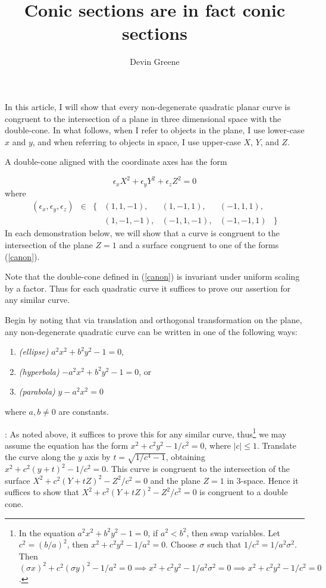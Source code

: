 \documentclass[12pt]{article}
\title{Conic sections are in fact conic sections}
\author{Devin Greene}
\date{}
\newcommand{\eps}{\epsilon}
\begin{document}
\maketitle

In this article, I will show that every non-degenerate quadratic
planar curve is congruent to the intersection of a plane in three
dimensional space with the double-cone.  In what follows, when I 
refer to objects in the plane, I use lower-case $x$ and $y$, and
when referring to objects in space, I use upper-case $X$, $Y$, and
$Z$.

A double-cone aligned with the coordinate axes has the form 

\begin{equation} \label{canon} \eps_x X^2 + \eps_y Y^2 + \eps_z
Z^2 = 0\end{equation}
where
$$\begin{matrix}(\eps_x,\eps_y,\eps_z) & \in  &
\{ &(1,1,-1),&(1,-1,1),&(-1,1,1), &\\
&&&(1,-1,-1),&(-1,1,-1),&(-1,-1,1) &\}\end{matrix}$$
In each demonstration below, we will show that a curve is congruent to
the intersection of the plane $Z = 1$ and a surface congruent to one
of the forms (\ref{canon}).

Note that the double-cone defined in (\ref{canon}) is invariant under
uniform scaling by a factor.  Thus for each quadratic curve it
suffices to prove our assertion for any similar curve.

Begin by noting that via translation and orthogonal transformation on
the plane, any non-degenerate quadratic curve can be written in one of
the following ways:

\begin{enumerate}
\item {\it (ellipse)} $a^2x^2 + b^2y^2 - 1 = 0$,
\item {\it (hyperbola)} $-a^2x^2 + b^2y^2 - 1 = 0$, or
\item {\it (parabola)} $y - a^2x^2 = 0$
\end{enumerate}
where $a,b \neq 0$ are constants.

\medskip

: As noted above, it suffices to prove this for
any similar curve, thus\footnote{
In the equation $a^2x^2 + b^2y^2 - 1 = 0$, if $a^2 < b^2$, then swap
variables.  Let $c^2 = (b/a)^2$, then $x^2 + c^2 y^2 - 1/a^2 = 0$.
Choose $\sigma$ such that $1/c^2 = 1/a^2\sigma^2$.  Then
$(\sigma x)^2
+ c^2 (\sigma y)^2 - 1/a^2 = 0 \implies x^2  + c^2 y^2 - 1/a^2\sigma^2
= 0 \implies x^2 + c^2 y^2 - 1/c^2 = 0$.
}
we may assume the equation has the form $x^2 + c^2 y^2 - 1/c^2 = 0$,
where $|c| \leq 1$.  Translate the curve along the $y$ axis by $t =
\sqrt{1/c^4 - 1}$, obtaining $x^2 + c^2 (y + t)^2 - 1/c^2 = 0$.  This
curve is congruent to the intersection of the surface $X^2 + c^2 (Y +
tZ)^2 - Z^2/c^2 = 0$ and the plane $Z = 1$ in 3-space.  Hence it
suffices to show that $ X^2 + c^2 (Y + tZ)^2 - Z^2/c^2 = 0$ is
congruent to a double cone.
\end{document}
